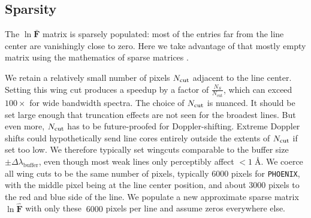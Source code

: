 \documentclass[modern]{aastex631}
\begin{document}
\subsection{Sparsity}

The $\ln{\bm{\bar{F}}}$ matrix is sparsely populated: most of the entries far from the line center are vanishingly close to zero. Here we take advantage of that mostly empty matrix using the mathematics of sparse matrices \citep{saad03:IMS}.

We retain a relatively small number of pixels $N_{\rm cut}$ adjacent to the line center. Setting this wing cut produces a speedup by a factor of $\frac{N_S}{N_{\mathrm{cut}}}$, which can exceed $100\times$ for wide bandwidth spectra. The choice of $N_{\rm cut}$ is nuanced.  It should be set large enough that truncation effects are not seen for the broadest lines.  But even more, $N_{\rm cut}$ has to be future-proofed for Doppler-shifting. Extreme Doppler shifts could hypothetically send line cores entirely outside the extents of $N_{\rm cut}$ if set too low.  We therefore typically set wingcuts comparable to the buffer size $\pm \Delta \lambda_{\mathrm{buffer}}$, even though most weak lines only perceptibly affect $<1\;$\AA. We coerce all wing cuts to be the same number of pixels, typically 6000 pixels for \texttt{PHOENIX}, with the middle pixel being at the line center position, and about 3000 pixels to the red and blue side of the line. We populate a new approximate sparse matrix $\ln{\bm{\hat{F}}}$ with only these $~6000$ pixels per line and assume zeros everywhere else.
\end{document}
